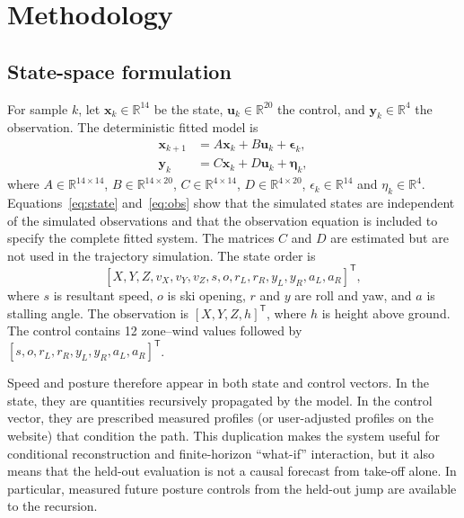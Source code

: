 \documentclass[11pt,twoside,a4paper]{article}
\begin{document}
\section{Methodology}\label{sec:method}

\subsection{State-space formulation}

For sample $k$, let $\mathbf{x}_k\in\mathbb{R}^{14}$ be the state, $\mathbf{u}_k\in\mathbb{R}^{20}$ the control, and $\mathbf{y}_k\in\mathbb{R}^{4}$ the observation. The deterministic fitted model is
\begin{align}
\mathbf{x}_{k+1} &= A\mathbf{x}_k+B\mathbf{u}_k+\boldsymbol{\epsilon}_k,\label{eq:state}\\
\mathbf{y}_{k} &= C\mathbf{x}_k+D\mathbf{u}_k+\boldsymbol{\eta}_k,\label{eq:obs}
\end{align}
where $A\in\mathbb{R}^{14\times14}$, $B\in\mathbb{R}^{14\times20}$, $C\in\mathbb{R}^{4\times14}$, $D\in\mathbb{R}^{4\times20}$, $\epsilon_k \in \mathbb{R}^{14}$ and $\eta_k \in \mathbb{R}^4$.
Equations~\eqref{eq:state} and~\eqref{eq:obs} show that the simulated states are independent of the simulated observations and that the observation equation is included to specify the complete fitted system. The matrices $C$ and $D$ are estimated but are not used in the trajectory simulation. 
The state order is
\[
[X,Y,Z,v_X,v_Y,v_Z,s,o,r_L,r_R,y_L,y_R,a_L,a_R]^{\mathsf T},
\]
where $s$ is resultant speed, $o$ is ski opening, $r$ and $y$ are roll and yaw, and $a$ is stalling angle. The observation is $[X,Y,Z,h]^{\mathsf T}$, where $h$ is height above ground. The control contains 12 zone--wind values followed by $[s,o,r_L,r_R,y_L,y_R,a_L,a_R]^{\mathsf T}$.

Speed and posture therefore appear in both state and control vectors. In the state, they are quantities recursively propagated by the model. In the control vector, they are prescribed measured profiles (or user-adjusted profiles on the website) that condition the path. This duplication makes the system useful for conditional reconstruction and finite-horizon ``what-if'' interaction, but it also means that the held-out evaluation is not a causal forecast from take-off alone. In particular, measured future posture controls from the held-out jump are available to the recursion.
\end{document}
